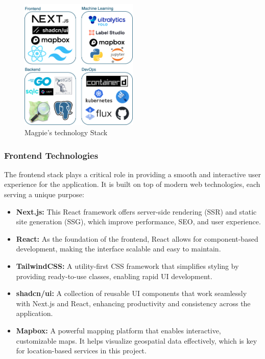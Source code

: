 \begin{figure}[htbp]
    \centering{}
    \includegraphics[width=0.5\textwidth]{images/stack_grid.png}
    \caption{Magpie's technology Stack}
\end{figure}

\subsubsection{Frontend Technologies}

The frontend stack plays a critical role in providing a smooth and interactive user experience for the application. It is built on top of modern web technologies, each serving a unique purpose:

\begin{itemize}
    \item{} \textbf{Next.js:} This React framework offers server{-}side rendering (SSR) and static site generation (SSG), which improve performance, SEO, and user experience.
    \item{} \textbf{React:} As the foundation of the frontend, React allows for component{-}based development, making the interface scalable and easy to maintain.
    \item{} \textbf{TailwindCSS:} A utility{-}first CSS framework that simplifies styling by providing ready{-}to{-}use classes, enabling rapid UI development.
    \item{} \textbf{shadcn/ui:} A collection of reusable UI components that work seamlessly with Next.js and React, enhancing productivity and consistency across the application.
    \item{} \textbf{Mapbox:} A powerful mapping platform that enables interactive, customizable maps. It helps visualize geospatial data effectively, which is key for location{-}based services in this project.
\end{itemize}


